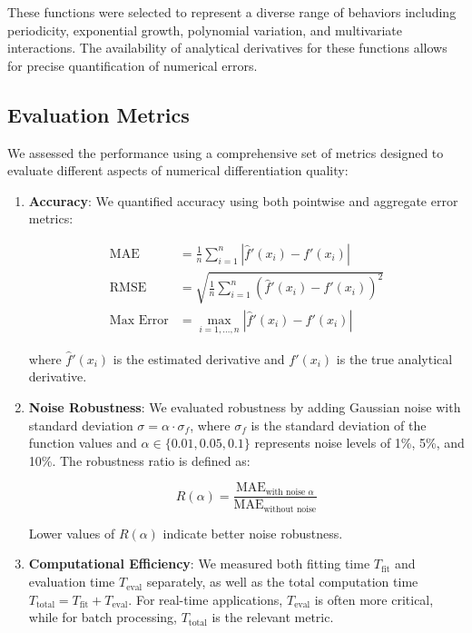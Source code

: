 \documentclass[10pt,journal,compsoc]{IEEEtran}
\begin{document}
These functions were selected to represent a diverse range of behaviors including periodicity, exponential growth, polynomial variation, and multivariate interactions. The availability of analytical derivatives for these functions allows for precise quantification of numerical errors.

\subsection{Evaluation Metrics}

We assessed the performance using a comprehensive set of metrics designed to evaluate different aspects of numerical differentiation quality:

\begin{enumerate}
    \item \textbf{Accuracy}: We quantified accuracy using both pointwise and aggregate error metrics:
    
    \begin{align}
        \text{MAE} &= \frac{1}{n}\sum_{i=1}^{n}|\hat{f}'(x_i) - f'(x_i)| \\[5pt]
        \text{RMSE} &= \sqrt{\frac{1}{n}\sum_{i=1}^{n}(\hat{f}'(x_i) - f'(x_i))^2} \\[5pt]
        \text{Max Error} &= \max_{i=1,\ldots,n}|\hat{f}'(x_i) - f'(x_i)|
    \end{align}
    
    where $\hat{f}'(x_i)$ is the estimated derivative and $f'(x_i)$ is the true analytical derivative.
    
    \item \textbf{Noise Robustness}: We evaluated robustness by adding Gaussian noise with standard deviation $\sigma = \alpha \cdot \sigma_f$, where $\sigma_f$ is the standard deviation of the function values and $\alpha \in \{0.01, 0.05, 0.1\}$ represents noise levels of 1\%, 5\%, and 10\%. The robustness ratio is defined as:
    
    \begin{equation}
        R(\alpha) = \frac{\text{MAE}_{\text{with noise } \alpha}}{\text{MAE}_{\text{without noise}}}
    \end{equation}
    
    Lower values of $R(\alpha)$ indicate better noise robustness.
    
    \item \textbf{Computational Efficiency}: We measured both fitting time $T_{\text{fit}}$ and evaluation time $T_{\text{eval}}$ separately, as well as the total computation time $T_{\text{total}} = T_{\text{fit}} + T_{\text{eval}}$. For real-time applications, $T_{\text{eval}}$ is often more critical, while for batch processing, $T_{\text{total}}$ is the relevant metric.
    

\end{enumerate}
\end{document}
